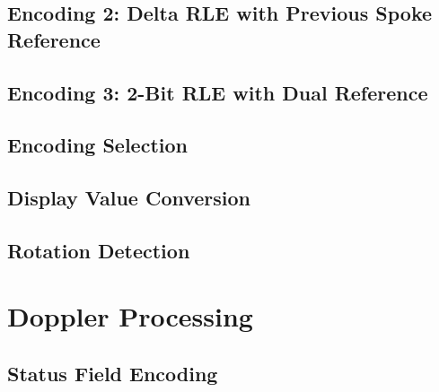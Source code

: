 \documentclass[11pt,letterpaper]{article}
\begin{document}

\subsection{Encoding 2: Delta RLE with Previous Spoke Reference}
\label{subsec:encoding-2}


\subsection{Encoding 3: 2-Bit RLE with Dual Reference}
\label{subsec:encoding-3}


\subsection{Encoding Selection}
\label{subsec:encoding-selection}


\subsection{Display Value Conversion}
\label{subsec:display-conversion}


\subsection{Rotation Detection}
\label{subsec:rotation-detection}



\newpage
\section{Doppler Processing}
\label{sec:doppler}

\subsection{Status Field Encoding}
\label{subsec:doppler-status}
\end{document}
